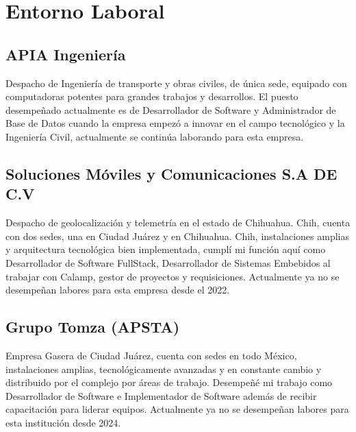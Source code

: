 \documentclass[protocolo.tex]{subfiles}
\begin{document}
\section{Entorno Laboral}

\subsection{APIA Ingeniería}
Despacho de Ingeniería de transporte y obras civiles, de única sede, equipado con computadoras potentes para grandes trabajos y desarrollos. El puesto desempeñado actualmente es de Desarrollador de Software y Administrador de Base de Datos cuando la empresa empezó a innovar en el campo tecnológico y la Ingeniería Civil, actualmente se continúa laborando para esta empresa.

\subsection{Soluciones Móviles y Comunicaciones S.A DE C.V}
Despacho de geolocalización y telemetría en el estado de Chihuahua. Chih, cuenta con dos sedes, una en Ciudad Juárez y en Chihuahua. Chih, instalaciones amplias y arquitectura tecnológica bien implementada, cumplí mi función aquí como Desarrollador de Software FullStack, Desarrollador de Sistemas Embebidos al trabajar con Calamp, gestor de proyectos y requisiciones. Actualmente ya no se desempeñan labores para esta empresa desde el 2022.

\subsection{Grupo Tomza (APSTA)}
Empresa Gasera de Ciudad Juárez, cuenta con sedes en todo México, instalaciones amplias, tecnológicamente avanzadas y en constante cambio y distribuido por el complejo por áreas de trabajo. Desempeñé mi trabajo como Desarrollador de Software e Implementador de Software además de recibir capacitación para liderar equipos. Actualmente ya no se desempeñan labores para esta institución desde 2024.
\end{document}
